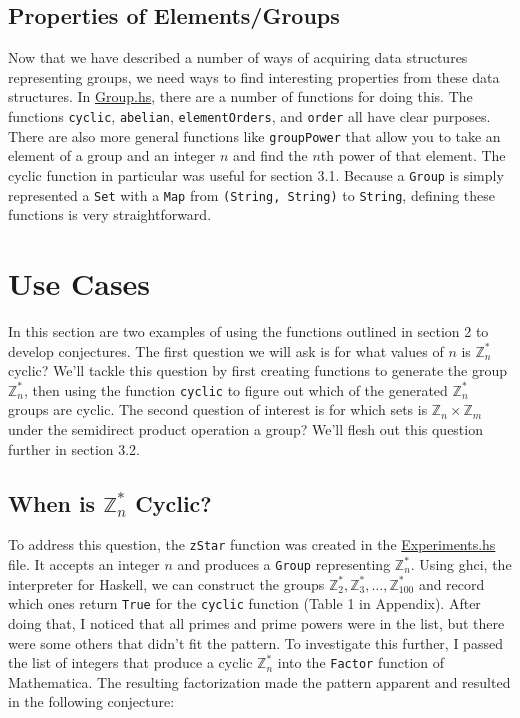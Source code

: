 \documentclass[11pt,a4paper]{article}
\theoremstyle{definition}
\begin{document}
\subsection{Properties of Elements/Groups}

Now that we have described a number of ways of acquiring data structures representing groups, we need ways to find interesting properties from these data structures. In \href{https://github.com/gr-a-m/GrCal/blob/master/src/GrCal/Group.hs}{Group.hs}, there are a number of functions for doing this. The functions \texttt{cyclic}, \texttt{abelian}, \texttt{elementOrders}, and \texttt{order} all have clear purposes. There are also more general functions like \texttt{groupPower} that allow you to take an element of a group and an integer $n$ and find the $n$th power of that element. The cyclic function in particular was useful for section 3.1. Because a \texttt{Group} is simply represented a \texttt{Set} with a \texttt{Map} from \texttt{(String, String)} to \texttt{String}, defining these functions is very straightforward.

\section{Use Cases}

In this section are two examples of using the functions outlined in section 2 to develop conjectures. The first question we will ask is for what values of $n$ is $\mathbb{Z}_n^\ast$ cyclic? We'll tackle this question by first creating functions to generate the group $\mathbb{Z}_n^\ast$, then using the function \texttt{cyclic} to figure out which of the generated $\mathbb{Z}_n^\ast$ groups are cyclic. The second question of interest is for which sets is $\mathbb{Z}_n \times \mathbb{Z}_m$ under the semidirect product operation a group? We'll flesh out this question further in section 3.2.

\subsection{When is $\mathbb{Z}_n^\ast$ Cyclic?}

To address this question, the \texttt{zStar} function was created in the \href{https://github.com/gr-a-m/GrCal/blob/master/src/GrCal/Experiments.hs}{Experiments.hs} file. It accepts an integer $n$ and produces a \texttt{Group} representing $\mathbb{Z}_n^\ast$. Using ghci, the interpreter for Haskell, we can construct the groups $\mathbb{Z}_2^\ast, \mathbb{Z}_3^\ast, \ldots, \mathbb{Z}_{100}^\ast$ and record which ones return \texttt{True} for the \texttt{cyclic} function (Table 1 in Appendix). After doing that, I noticed that all primes and prime powers were in the list, but there were some others that didn't fit the pattern. To investigate this further, I passed the list of integers that produce a cyclic $\mathbb{Z}_n^\ast$ into the \texttt{Factor} function of Mathematica. The resulting factorization made the pattern apparent and resulted in the following conjecture:
\end{document}
